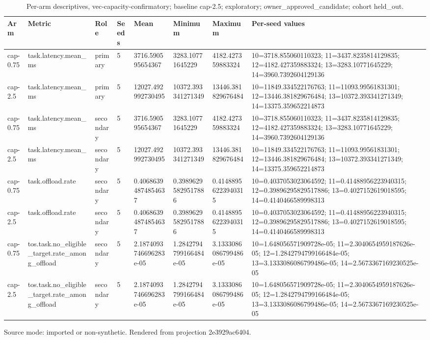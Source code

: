 {
\begin{table}[htbp]
\centering
\caption{Per-arm descriptives, vec-capacity-confirmatory; baseline cap-2.5; exploratory; owner\_approved\_candidate; cohort held\_out.}
\label{tab:traffictwin-metrics-2e3929ac6404}
\small
\renewcommand{\arraystretch}{1.15}
\begin{tabular}{llllllll}
\hline
Arm & Metric & Role & Seeds & Mean & Minimum & Maximum & Per-seed values \\
\hline
cap-0.75 & task.latency.mean\_ms & primary & 5 & 3716.590595654367 & 3283.10771645229 & 4182.427359883324 & 10=3718.855060110323; 11=3437.8235814129835; 12=4182.427359883324; 13=3283.10771645229; 14=3960.7392604129136 \\
cap-2.5 & task.latency.mean\_ms & primary & 5 & 12027.492992730495 & 10372.393341271349 & 13446.381829676484 & 10=11849.334522176763; 11=11093.99561831301; 12=13446.381829676484; 13=10372.393341271349; 14=13375.359652214873 \\
cap-0.75 & task.latency.mean\_ms & secondary & 5 & 3716.590595654367 & 3283.10771645229 & 4182.427359883324 & 10=3718.855060110323; 11=3437.8235814129835; 12=4182.427359883324; 13=3283.10771645229; 14=3960.7392604129136 \\
cap-2.5 & task.latency.mean\_ms & secondary & 5 & 12027.492992730495 & 10372.393341271349 & 13446.381829676484 & 10=11849.334522176763; 11=11093.99561831301; 12=13446.381829676484; 13=10372.393341271349; 14=13375.359652214873 \\
cap-0.75 & task.offload.rate & secondary & 5 & 0.40686394874854637 & 0.39896295829517886 & 0.41488956223940315 & 10=0.4037053023064592; 11=0.41488956223940315; 12=0.39896295829517886; 13=0.4027152619018595; 14=0.4140466589998313 \\
cap-2.5 & task.offload.rate & secondary & 5 & 0.40686394874854637 & 0.39896295829517886 & 0.41488956223940315 & 10=0.4037053023064592; 11=0.41488956223940315; 12=0.39896295829517886; 13=0.4027152619018595; 14=0.4140466589998313 \\
cap-0.75 & tos.task.no\_eligible\_target.rate\_among\_offload & secondary & 5 & 2.1874093746696283e-05 & 1.2842794799166484e-05 & 3.1333086086799486e-05 & 10=1.648056571909728e-05; 11=2.3040654959187626e-05; 12=1.2842794799166484e-05; 13=3.1333086086799486e-05; 14=2.5673367169230525e-05 \\
cap-2.5 & tos.task.no\_eligible\_target.rate\_among\_offload & secondary & 5 & 2.1874093746696283e-05 & 1.2842794799166484e-05 & 3.1333086086799486e-05 & 10=1.648056571909728e-05; 11=2.3040654959187626e-05; 12=1.2842794799166484e-05; 13=3.1333086086799486e-05; 14=2.5673367169230525e-05 \\
\hline
\end{tabular}
\par\footnotesize
Source mode: imported or non-synthetic.
Rendered from projection 2e3929ac6404.
\end{table}
}
